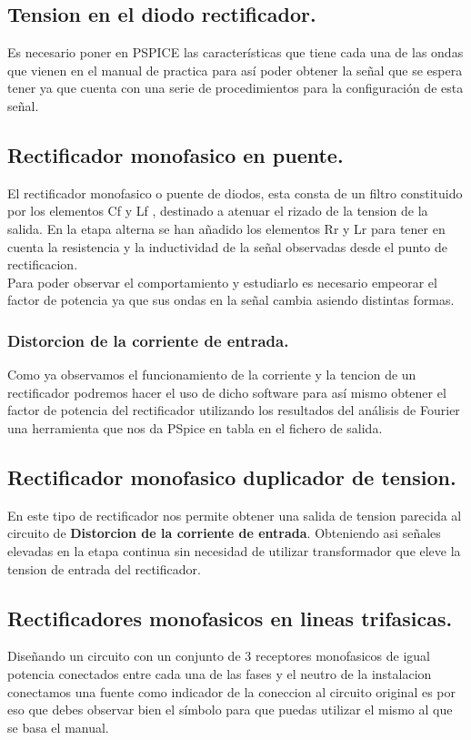 \subsection{Tension en el diodo rectificador.}
Es necesario poner en PSPICE las características que tiene cada una de las ondas que vienen en el manual de practica para así poder obtener la señal que se espera tener ya que cuenta con una serie de procedimientos para la configuración de esta señal.

\subsection{Rectificador monofasico en puente.}
El rectificador monofasico o puente de diodos, esta consta de un filtro constituido por los elementos Cf y Lf , destinado a atenuar el rizado de la tension de la  salida. En la etapa alterna se han añadido los elementos Rr y Lr para tener en cuenta la resistencia y la inductividad de la señal observadas desde el punto de rectificacion.\\
Para poder observar el comportamiento y estudiarlo es necesario empeorar el factor de potencia ya que sus ondas en la señal cambia asiendo distintas formas.
\subsubsection{Distorcion de la corriente de entrada.}
Como ya observamos el funcionamiento de la corriente y la tencion de un rectificador podremos hacer el uso de dicho software para así mismo obtener el factor de potencia del rectificador utilizando los resultados del análisis de Fourier una herramienta que nos da PSpice en tabla en el fichero de salida.
\subsection{Rectificador monofasico duplicador de tension.}
En este tipo de rectificador nos  permite obtener una salida de tension parecida al circuito de \textbf{Distorcion de la corriente de entrada}. Obteniendo asi señales elevadas en la etapa continua sin necesidad de utilizar transformador que eleve la tension de entrada del rectificador.

\subsection{Rectificadores monofasicos en lineas trifasicas.}
Diseñando un circuito con un  conjunto de 3 receptores monofasicos de igual potencia conectados entre cada una de las fases y el neutro de la instalacion conectamos una fuente como indicador de la coneccion al circuito original es por eso que debes observar bien el símbolo para que puedas utilizar el mismo al que se basa el manual.
